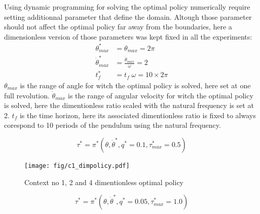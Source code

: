 Using dynamic programming for solving the optimal policy numerically require setting additionnal parameter that define the domain. Altough those parameter should not affect the optimal policy far away from the boundaries, here a dimensionless version of those parameters was kept fixed in all the experiments:
\begin{align}
\theta^*_{max} &= \theta_{max} = 2 \pi \\
\dot{\theta}^*_{max} &= \frac{ \dot{\theta}_{max} }{\omega} = 2 \\
t^*_{f} &= t_{f} \; \omega = 10 \times 2 \pi 
\end{align}
$\theta_{max}$ is the range of angle for witch the optimal policy is solved, here set at one full revolution. $\dot{\theta}_{max}$ is the range of angular velocity for witch the optimal policy is solved, here the dimentionless ratio scaled with the natural frequency is set at 2. $t_{f}$ is the time horizon, here its associated dimentionless ratio is fixed to always corespond to 10 periods of the pendulum using the natural frequency.






\newpage

\begin{equation}
\tau^*
=
\pi^* \left(
\theta, \dot{\theta}^*,
q^*=0.1 , \tau_{max}^* = 0.5
\right)
\end{equation}

\begin{figure}[H]
\begin{center}
\texttt{[image: fig/c1\_dimpolicy.pdf]}
\caption{Context no 1, 2 and 4 dimentionless optimal policy}\label{fig:c1_policy}
\end{center}
\end{figure}

\begin{equation}
\tau^*
=
\pi^* \left(
\theta, \dot{\theta}^*,
q^*=0.05 , \tau_{max}^* = 1.0
\right)
\end{equation}

